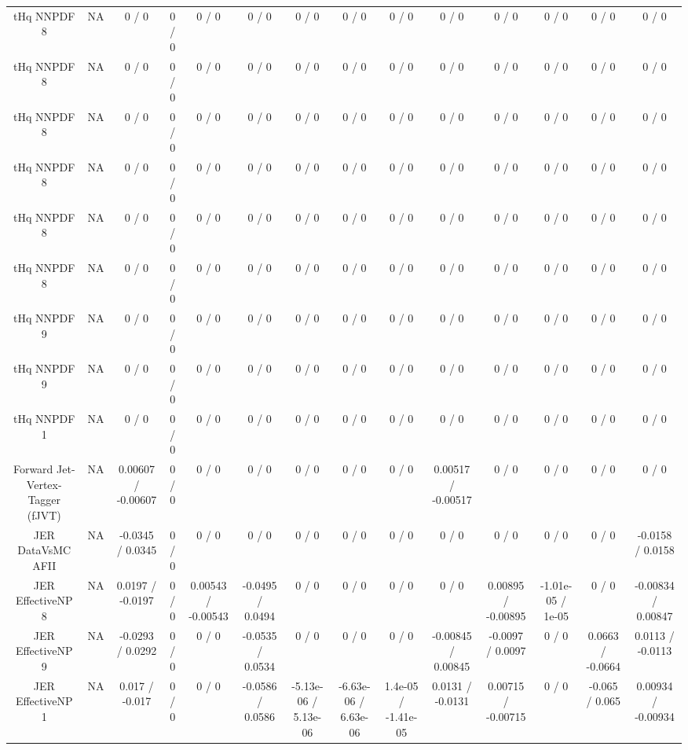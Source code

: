 \documentclass[10pt]{article}
\begin{document}
\begin{table}[htbp]
\begin{center}
\begin{tabular}{|c|c|c|c|c|c|c|c|c|c|c|c|c|c|}
  tHq NNPDF 8 &    NA    & 0 / 0 & 0 / 0 & 0 / 0 & 0 / 0 & 0 / 0 & 0 / 0 & 0 / 0 & 0 / 0 & 0 / 0 & 0 / 0 & 0 / 0 & 0 / 0 \\ 
  tHq NNPDF 8 &    NA    & 0 / 0 & 0 / 0 & 0 / 0 & 0 / 0 & 0 / 0 & 0 / 0 & 0 / 0 & 0 / 0 & 0 / 0 & 0 / 0 & 0 / 0 & 0 / 0 \\ 
  tHq NNPDF 8 &    NA    & 0 / 0 & 0 / 0 & 0 / 0 & 0 / 0 & 0 / 0 & 0 / 0 & 0 / 0 & 0 / 0 & 0 / 0 & 0 / 0 & 0 / 0 & 0 / 0 \\ 
  tHq NNPDF 8 &    NA    & 0 / 0 & 0 / 0 & 0 / 0 & 0 / 0 & 0 / 0 & 0 / 0 & 0 / 0 & 0 / 0 & 0 / 0 & 0 / 0 & 0 / 0 & 0 / 0 \\ 
  tHq NNPDF 8 &    NA    & 0 / 0 & 0 / 0 & 0 / 0 & 0 / 0 & 0 / 0 & 0 / 0 & 0 / 0 & 0 / 0 & 0 / 0 & 0 / 0 & 0 / 0 & 0 / 0 \\ 
  tHq NNPDF 8 &    NA    & 0 / 0 & 0 / 0 & 0 / 0 & 0 / 0 & 0 / 0 & 0 / 0 & 0 / 0 & 0 / 0 & 0 / 0 & 0 / 0 & 0 / 0 & 0 / 0 \\ 
  tHq NNPDF 9 &    NA    & 0 / 0 & 0 / 0 & 0 / 0 & 0 / 0 & 0 / 0 & 0 / 0 & 0 / 0 & 0 / 0 & 0 / 0 & 0 / 0 & 0 / 0 & 0 / 0 \\ 
  tHq NNPDF 9 &    NA    & 0 / 0 & 0 / 0 & 0 / 0 & 0 / 0 & 0 / 0 & 0 / 0 & 0 / 0 & 0 / 0 & 0 / 0 & 0 / 0 & 0 / 0 & 0 / 0 \\ 
  tHq NNPDF 1 &    NA    & 0 / 0 & 0 / 0 & 0 / 0 & 0 / 0 & 0 / 0 & 0 / 0 & 0 / 0 & 0 / 0 & 0 / 0 & 0 / 0 & 0 / 0 & 0 / 0 \\ 
  Forward Jet-Vertex-Tagger (fJVT) &    NA    & 0.00607 / -0.00607 & 0 / 0 & 0 / 0 & 0 / 0 & 0 / 0 & 0 / 0 & 0 / 0 & 0.00517 / -0.00517 & 0 / 0 & 0 / 0 & 0 / 0 & 0 / 0 \\ 
  JER DataVsMC AFII &    NA    & -0.0345 / 0.0345 & 0 / 0 & 0 / 0 & 0 / 0 & 0 / 0 & 0 / 0 & 0 / 0 & 0 / 0 & 0 / 0 & 0 / 0 & 0 / 0 & -0.0158 / 0.0158 \\ 
  JER EffectiveNP 8 &    NA    & 0.0197 / -0.0197 & 0 / 0 & 0.00543 / -0.00543 & -0.0495 / 0.0494 & 0 / 0 & 0 / 0 & 0 / 0 & 0 / 0 & 0.00895 / -0.00895 & -1.01e-05 / 1e-05 & 0 / 0 & -0.00834 / 0.00847 \\ 
  JER EffectiveNP 9 &    NA    & -0.0293 / 0.0292 & 0 / 0 & 0 / 0 & -0.0535 / 0.0534 & 0 / 0 & 0 / 0 & 0 / 0 & -0.00845 / 0.00845 & -0.0097 / 0.0097 & 0 / 0 & 0.0663 / -0.0664 & 0.0113 / -0.0113 \\ 
  JER EffectiveNP 1 &    NA    & 0.017 / -0.017 & 0 / 0 & 0 / 0 & -0.0586 / 0.0586 & -5.13e-06 / 5.13e-06 & -6.63e-06 / 6.63e-06 & 1.4e-05 / -1.41e-05 & 0.0131 / -0.0131 & 0.00715 / -0.00715 & 0 / 0 & -0.065 / 0.065 & 0.00934 / -0.00934 \\ 

\end{tabular}
\end{center}
\end{table}
\end{document}
